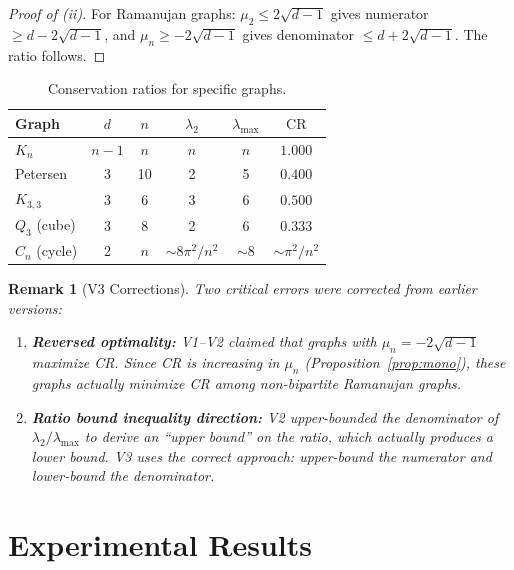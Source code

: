 \documentclass[12pt,letterpaper]{article}
\newtheorem{remark}[theorem]{Remark}
\newcommand{\CR}{\mathrm{CR}}
\begin{document}
\begin{proof}[Proof of (ii)]
For Ramanujan graphs: $\mu_2 \leq 2\sqrt{d-1}$ gives numerator $\geq d - 2\sqrt{d-1}$, and $\mu_n \geq -2\sqrt{d-1}$ gives denominator $\leq d + 2\sqrt{d-1}$. The ratio follows.
\end{proof}

\begin{table}[ht]
\centering
\caption{Conservation ratios for specific graphs.}
\begin{tabular}{lccccc}
\toprule
Graph & $d$ & $n$ & $\lambda_2$ & $\lambda_{\max}$ & $\CR$ \\
\midrule
$K_n$ & $n-1$ & $n$ & $n$ & $n$ & $1.000$ \\
Petersen & 3 & 10 & 2 & 5 & $0.400$ \\
$K_{3,3}$ & 3 & 6 & 3 & 6 & $0.500$ \\
$Q_3$ (cube) & 3 & 8 & 2 & 6 & $0.333$ \\
$C_n$ (cycle) & 2 & $n$ & $\sim 8\pi^2/n^2$ & $\sim 8$ & $\sim \pi^2/n^2$ \\
\bottomrule
\end{tabular}
\end{table}

\begin{remark}[V3 Corrections]
Two critical errors were corrected from earlier versions:
\begin{enumerate}
  \item \textbf{Reversed optimality:} V1--V2 claimed that graphs with $\mu_n = -2\sqrt{d-1}$ \emph{maximize} CR. Since CR is \emph{increasing} in $\mu_n$ (Proposition~\ref{prop:mono}), these graphs actually \emph{minimize} CR among non-bipartite Ramanujan graphs.
  \item \textbf{Ratio bound inequality direction:} V2 upper-bounded the denominator of $\lambda_2/\lambda_{\max}$ to derive an ``upper bound'' on the ratio, which actually produces a lower bound. V3 uses the correct approach: upper-bound the numerator and lower-bound the denominator.
\end{enumerate}
\end{remark}

\section{Experimental Results}
\label{sec:experiments}
\end{document}
